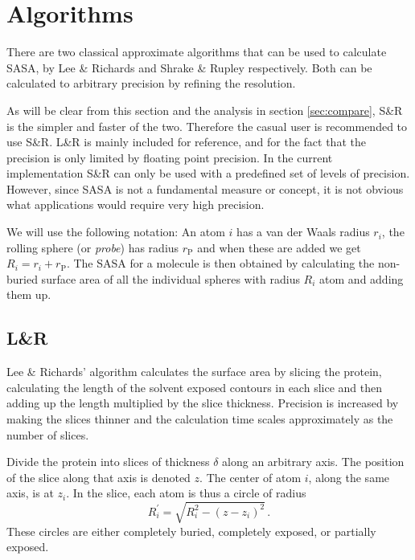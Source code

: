 \documentclass[a4paper,11pt]{article}
\begin{document}
\section{Algorithms}\label{sec:alg}

There are two classical approximate algorithms that can be used to
calculate SASA, by Lee \& Richards \cite{LnR} and Shrake \& Rupley
\cite{SnR} respectively. Both can be calculated to arbitrary precision
by refining the resolution. 

As will be clear from this section and the analysis in section
\ref{sec:compare}, S\&R is the simpler and faster of the
two. Therefore the casual user is recommended to use S\&R. L\&R is
mainly included for reference, and for the fact that the precision is
only limited by floating point precision. In the current
implementation S\&R can only be used with a predefined set of levels
of precision. However, since SASA is not a fundamental measure or
concept, it is not obvious what applications would require very high
precision.

We will use the following notation: An atom $i$ has a van der Waals
radius $r_i$, the rolling sphere (or \emph{probe}) has radius
$r_\text{P}$ and when these are added we get $R_i = r_i +
r_\text{P}$. The SASA for a molecule is then obtained by calculating
the non-buried surface area of all the individual spheres with radius
$R_i$ atom and adding them up.

\subsection{L\&R} \label{sec:alg_LnR}

Lee \& Richards' algorithm calculates the surface area by slicing the
protein, calculating the length of the solvent exposed contours in
each slice and then adding up the length multiplied by the slice
thickness. Precision is increased by making the slices thinner and the
calculation time scales approximately as the number of slices.

Divide the protein into slices of thickness $\delta$ along an
arbitrary axis. The position of the slice along that axis is denoted
$z$. The center of atom $i$, along the same axis, is at $z_i$. In the
slice, each atom is thus a circle of radius $$R_i^\prime =
\sqrt{R_i^2-(z-z_i)^2}\,.$$ These circles are either completely
buried, completely exposed, or partially exposed.
\end{document}
